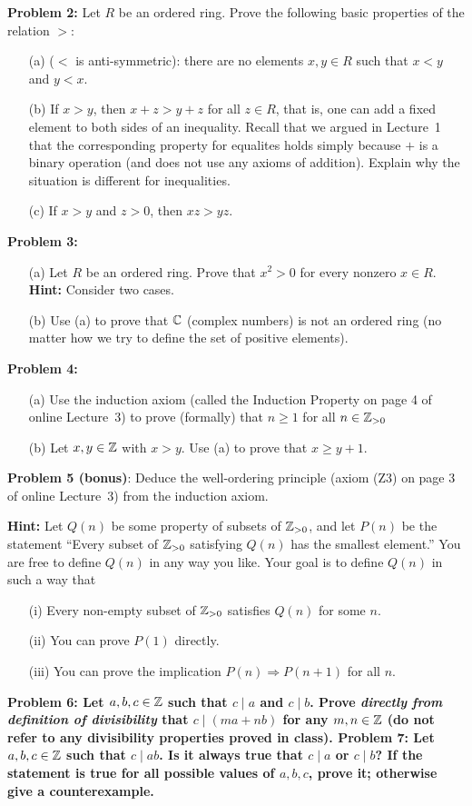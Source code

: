 \documentclass[11pt]{amsart}
\begin{document}
\skv
{\bf Problem 2:} Let $R$ be an ordered ring. Prove the following basic properties of the relation $>$:
\begin{itemize}
\item[(a)] ($<$ is anti-symmetric): there are no elements $x,y\in R$ such that $x<y$ and $y<x$.
\item[(b)] If $x>y$, then $x+z>y+z$ for all $z\in R$, that is, one can add a fixed element to both sides of an inequality. Recall
that we argued in Lecture~1 that the corresponding property for equalites holds simply because $+$ is a binary operation (and does not
use any axioms of addition). Explain why the situation is different for inequalities.
\item[(c)] If $x>y$ and $z>0$, then $xz>yz$.
\end{itemize}

\skv
{\bf Problem 3:}
\begin{itemize}
\item[(a)] Let $R$ be an ordered ring. Prove that $x^2>0$ for every nonzero $x\in R$.
{\bf Hint:} Consider two cases.
\item[(b)] Use (a) to prove that ${\mathbb C}$ (complex numbers) is not an ordered ring (no matter how we try
to define the set of positive elements).
\end{itemize}
\skv
{\bf Problem 4:} 
\begin{itemize}
\item[(a)] 
Use the induction axiom (called the Induction Property on page 4 of online Lecture~3) to
prove (formally) that $n\geq 1$ for all $n\in{\mathbb Z}_{>0}$
\item[(b)] Let $x,y\in{\mathbb Z}$ with $x>y$. Use (a) to prove that $x\geq y+1$.
\end{itemize}
\skv
{\bf Problem 5 (bonus)}: Deduce the well-ordering principle (axiom (Z3) on page 3 of online Lecture~3) from the induction axiom.

{\bf Hint:} Let $Q(n)$ be some property of subsets of ${\mathbb Z}_{>0}$, and let $P(n)$ be the statement
``Every subset of ${\mathbb Z}_{>0}$ satisfying $Q(n)$ has the smallest element.'' You are free to define
$Q(n)$ in any way you like. Your goal is to define $Q(n)$ in such a way that
\begin{itemize}
\item[(i)] Every non-empty subset of ${\mathbb Z}_{>0}$ satisfies $Q(n)$ for some $n$.
\item[(ii)] You can prove $P(1)$ directly.
\item[(iii)] You can prove the implication $P(n)\Rightarrow P(n+1)$ for all $n$.
\end{itemize}

\skv
\bf{Problem 6: }\rm Let $a,b,c\in{\mathbb Z}$ such that $c\mid a$ and $c\mid b$. Prove {\it directly
from definition of divisibility} that $c\mid (ma+nb)$ for any $m,n\in{\mathbb Z}$ (do not refer
to any divisibility properties proved in class).
\skv
\bf{Problem 7: }\rm Let $a,b,c\in{\mathbb Z}$ such that $c\mid ab$. Is it always true that $c\mid a$ or $c\mid b$?
If the statement is true for all possible values of $a,b,c$, prove it; otherwise give a counterexample.
\end{document}
